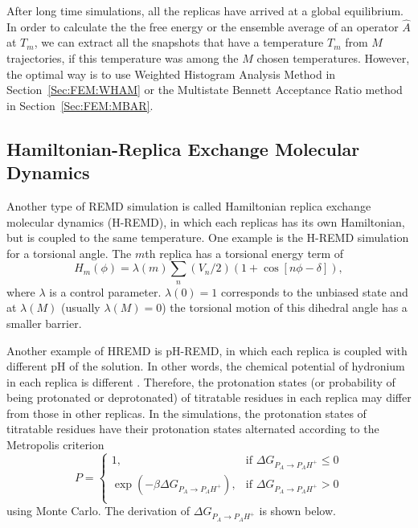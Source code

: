 After long time simulations, all the replicas have arrived at a global equilibrium. In order to calculate the the free energy or the ensemble average of an operator $\hat A$ at $T_m$, we can extract all the snapshots that have a temperature $T_m$ from $M$ trajectories, if this temperature was among the $M$ chosen temperatures. However, the optimal way is to use Weighted Histogram Analysis Method in Section~\ref{Sec:FEM:WHAM} or the Multistate Bennett Acceptance Ratio method in Section~\ref{Sec:FEM:MBAR}.  

\subsection{Hamiltonian-Replica Exchange Molecular Dynamics}
Another type of REMD simulation is called Hamiltonian replica exchange molecular dynamics (H-REMD), in which each replicas has its own Hamiltonian, but is coupled to the same temperature. One example is the H-REMD simulation for a torsional angle. The $m$th replica has a torsional energy term of 
\begin{equation}
	H_m(\phi)=\lambda(m)\sum_n\left(V_n/2\right)\left(1+\cos{\left[n\phi-\delta\right]}\right),
\end{equation}
where $\lambda$ is a control parameter. $\lambda(0)=1$ corresponds to the unbiased state and at $\lambda(M)$ (usually $\lambda(M)=0$) the torsional motion of this dihedral angle has a smaller barrier.

Another example of HREMD is pH-REMD, in which each replica is coupled with different pH of the solution. In other words, the chemical potential of hydronium in each replica is different . Therefore, the protonation states (or probability of being protonated or deprotonated) of titratable residues in each replica may differ from those in other replicas. In the simulations, the protonation states of titratable residues have their protonation states alternated according to the Metropolis criterion
\begin{equation}
	P= 
	\left\{ 
	\begin{array}{ll} 
		1, & \text{if } \Delta G_{P_{A}\rightarrow P_{A}H^{+}}\leq 0\\ 
		\exp{(-\beta\Delta G_{P_{A}\rightarrow P_{A}H^{+}})}, & \text{if }\Delta G_{P_{A}\rightarrow P_{A}H^{+}} >0\\  
	\end{array} 
	\right. 
\end{equation}
using Monte Carlo. The derivation of $\Delta G_{P_{A}\rightarrow P_{A}H^{+}}$ is shown below. 

